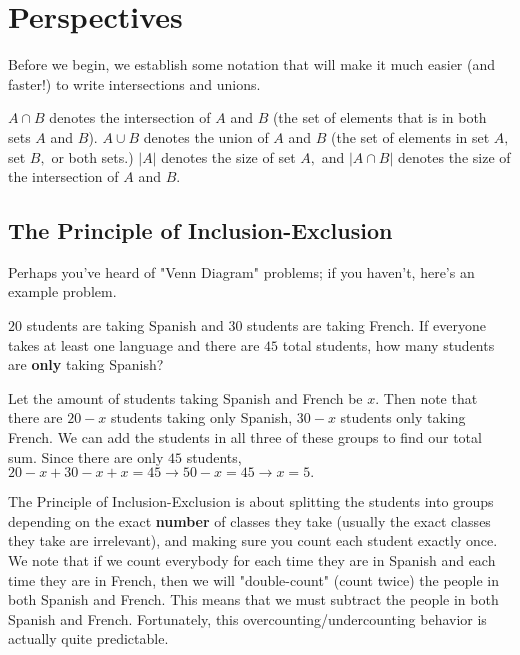 \documentclass[blue,onecol]{shooting}
\begin{document}

\chapter{Perspectives}
Before we begin, we establish some notation that will make it much easier (and faster!) to write intersections and unions.

$A\cap B$ denotes the intersection of $A$ and $B$ (the set of elements that is in both sets $A$ and $B$). $A\cup B$ denotes the union of $A$ and $B$ (the set of elements in set $A,$ set $B,$ or both sets.) $|A|$ denotes the size of set $A,$ and $|A\cap B|$ denotes the size of the intersection of $A$ and $B.$

\section{The Principle of Inclusion-Exclusion}

Perhaps you've heard of "Venn Diagram" problems; if you haven't, here's an example problem.

\begin{exam}
$20$ students are taking Spanish and $30$ students are taking French. If everyone takes at least one language and there are $45$ total students, how many students are \textbf{only} taking Spanish?
\end{exam}

\begin{sol}
Let the amount of students taking Spanish and French be $x.$ Then note that there are $20-x$ students taking only Spanish, $30-x$ students only taking French. We can add the students in all three of these groups to find our total sum. Since there are only $45$ students, $20-x+30-x+x=45\to 50-x=45\to x=5.$
\end{sol}

The Principle of Inclusion-Exclusion is about splitting the students into groups depending on the exact \textbf{number} of classes they take (usually the exact classes they take are irrelevant), and making sure you count each student exactly once. We note that if we count everybody for each time they are in Spanish and each time they are in French, then we will "double-count" (count twice) the people in both Spanish and French. This means that we must subtract the people in both Spanish and French. Fortunately, this overcounting/undercounting behavior is actually quite predictable.
\end{document}
